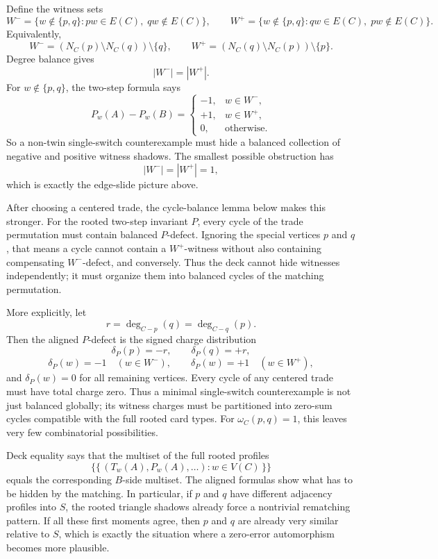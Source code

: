 \documentclass[11pt]{article}
\begin{document}
Define the witness sets
\[
  W^- = \{w\notin\{p,q\}: pw\in E(C),\; qw\notin E(C)\},
  \qquad
  W^+ = \{w\notin\{p,q\}: qw\in E(C),\; pw\notin E(C)\}.
\]
Equivalently,
\[
  W^- = (N_C(p)\setminus N_C(q))\setminus\{q\},
  \qquad
  W^+ = (N_C(q)\setminus N_C(p))\setminus\{p\}.
\]
Degree balance gives
\[
  |W^-|=|W^+|.
\]
For \(w\notin\{p,q\}\), the two-step formula says
\[
  P_w(A)-P_w(B)=
  \begin{cases}
    -1, & w\in W^-,\\
    +1, & w\in W^+,\\
    0, & \text{otherwise.}
  \end{cases}
\]
So a non-twin single-switch counterexample must hide a balanced collection of
negative and positive witness shadows.  The smallest possible obstruction has
\[
  |W^-|=|W^+|=1,
\]
which is exactly the edge-slide picture above.

After choosing a centered trade, the cycle-balance lemma below makes this
stronger.  For the rooted two-step invariant \(P\), every cycle of the trade
permutation must contain balanced \(P\)-defect.  Ignoring the special vertices
\(p\) and \(q\), that means a cycle cannot contain a \(W^+\)-witness without
also containing compensating \(W^-\)-defect, and conversely.  Thus the deck
cannot hide witnesses independently; it must organize them into balanced
cycles of the matching permutation.

More explicitly, let
\[
  r=\deg_{C-p}(q)=\deg_{C-q}(p).
\]
Then the aligned \(P\)-defect is the signed charge distribution
\[
  \delta_P(p)=-r,\qquad \delta_P(q)=+r,
\]
\[
  \delta_P(w)=-1\quad(w\in W^-),
  \qquad
  \delta_P(w)=+1\quad(w\in W^+),
\]
and \(\delta_P(w)=0\) for all remaining vertices.  Every cycle of any
centered trade must have total charge zero.  Thus a minimal single-switch
counterexample is not just balanced globally; its witness charges must be
partitioned into zero-sum cycles compatible with the full rooted card types.
For \(\omega_C(p,q)=1\), this leaves very few combinatorial possibilities.

Deck equality says that the multiset of the full rooted profiles
\[
  \{\!\{\, (T_w(A),P_w(A),\ldots) : w\in V(C) \,\}\!\}
\]
equals the corresponding \(B\)-side multiset.  The aligned formulas show what
has to be hidden by the matching.  In particular, if \(p\) and \(q\) have
different adjacency profiles into \(S\), the rooted triangle shadows already
force a nontrivial rematching pattern.  If all these first moments agree, then
\(p\) and \(q\) are already very similar relative to \(S\), which is exactly
the situation where a zero-error automorphism becomes more plausible.
\end{document}
